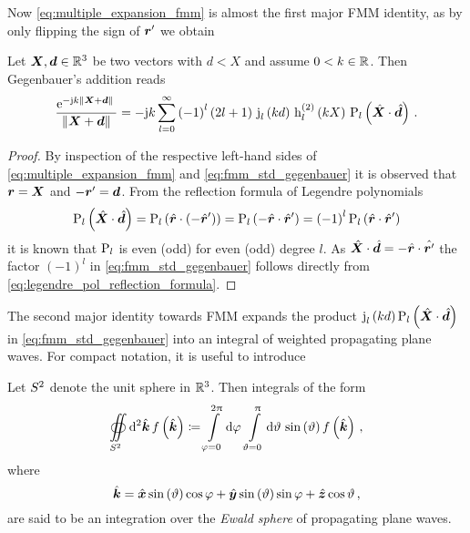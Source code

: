 Now \eqref{eq:multiple_expansion_fmm} is almost the first major \ac{FMM}
identity, as by only flipping the sign of $\rsrc$ we obtain
\begin{lemma}
	Let $\pvec{X}, \pvec{d} \in \R^3$ be two vectors with
	$d < X$ and assume $0 < k \in \mathbb{R}$.
	Then Gegenbauer's addition reads
	\begin{equation}\label{eq:fmm_std_gegenbauer}
		\frac{\exp{-\im k \norm{\pvec{X} + \pvec{d}}}}{\norm{\pvec{X} + \pvec{d}}} = 
		-\im k \sum\limits_{l=0}^{\infty}
		\left( -1 \right)^l
		\left( 2l + 1 \right) \,
		\sphbesselj{l} \left( k d  \right) \,
		\sphbesselh{2}{l} \left( k X \right) \, 
		\legendrepl{l} \left( \uv{X} \cdot  \uv{d} \right)
		\, .
	\end{equation}
\end{lemma} 
\begin{proof}
	By inspection of the respective left-hand sides of
	\eqref{eq:multiple_expansion_fmm} and
	\eqref{eq:fmm_std_gegenbauer} it is observed that $\robs = \pvec{X}$
	and $-\rsrc = \pvec{d}$.
	From the reflection formula of Legendre polynomials
	\cite[(14.7.17)]{Olver2010}
	\begin{equation}\label{eq:legendre_pol_reflection_formula}
		\legendrepl{l} \left( \uv{X} \cdot \uv{d} \right) =
		\legendrepl{l} \left( \uv{r} \cdot \left(-\uv{r}^\prime\right) \right) =
		\legendrepl{l} \left( -\uv{r} \cdot \uv{r}^\prime \right) =
		\left(-1\right)^l \legendrepl{l} \left( \uv{r} \cdot \uv{r}^\prime \right)
	\end{equation}
	it is known that $\operatorname{P}_{l}$ is even (odd) for even (odd) degree $l$.
	As $\uv{X} \cdot \uv{d} = -\uv{r} \cdot \uv{r^\prime} $
	the factor $\left(-1\right)^l$ in \eqref{eq:fmm_std_gegenbauer} follows
	directly from \eqref{eq:legendre_pol_reflection_formula}.
\end{proof}

The second major identity towards \ac{FMM} expands the product 
$\sphbesselj{l} \left( k d \right) \legendrepl{l} \left( \uv{X} \cdot \uv{d} \right)$
in \eqref{eq:fmm_std_gegenbauer} into an integral of weighted propagating plane
waves.
For compact notation, it is useful to introduce
\begin{definition}\label{def:ewald_sphere}
	Let $S^2$ denote the unit sphere in $\mathbb{R}^3$. Then
	integrals of the form
	\begin{equation}\label{eq:ewald_sphere_integral}
		\ewaldintegral f \left(\uv{k}\right) 
		\coloneqq
		\int\limits_{\varphi = 0}^{2\pi} \dd \varphi \, 
		\int\limits_{\vartheta = 0}^{\pi} \dd \vartheta  \, 
		\sin\left(\vartheta \right)
		f \left(\uv{k}\right)
		\, ,
	\end{equation}
	where
	\begin{equation}
		\uv{k} =
		\uv{x} \sin \left(\vartheta\right) \cos \varphi +
		\uv{y} \sin \left(\vartheta\right) \sin \varphi +
		\uv{z} \cos \vartheta \, ,
	\end{equation}
	are said to be an integration over the \emph{Ewald sphere} of propagating
	plane waves.
\end{definition}

